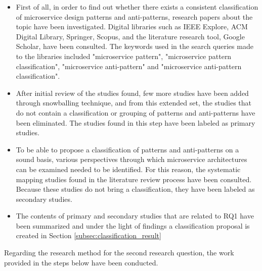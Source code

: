\documentclass{Configuration_Files/PoliMi3i_thesis}
\begin{document}
\begin{itemize}
    \item First of all, in order to find out whether there exists a consistent classification of microservice design patterns and anti-patterns, research papers about the topic have been investigated.
    Digital libraries such as IEEE Explore, ACM Digital Library, Springer, Scopus, and the literature research tool, Google Scholar, have been consulted.
    The keywords used in the search queries made to the libraries included "microservice pattern", "microservice pattern classification", "microservice anti-pattern" and "microservice anti-pattern classification".

    \item After initial review of the studies found, few more studies have been added through snowballing technique, and from this extended set, the studies that do not contain a classification or grouping of patterns and anti-patterns have been eliminated.
    The studies found in this step have been labeled as primary studies.
    
    \item To be able to propose a classification of patterns and anti-patterns on a sound basis, various perspectives through which microservice architectures can be examined needed to be identified.
    For this reason, the systematic mapping studies found in the literature review process have been consulted.
    Because these studies do not bring a classification, they have been labeled as secondary studies.
    
    \item The contents of primary and secondary studies that are related to RQ1 have been summarized and under the light of findings a classification proposal is created in Section \ref{subsec:classification_result}
\end{itemize}

Regarding the research method for the second research question, the work provided in the steps below have been conducted.
\end{document}
